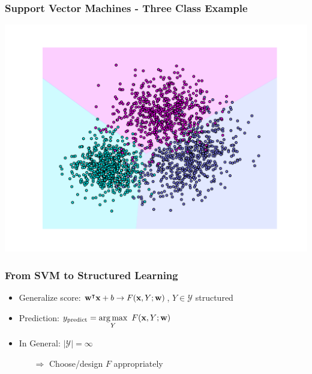 \begin{frame}
    \frametitle{Support Vector Machines - Three Class Example}
    \includegraphics[width=\textwidth]{images/three_class_svm.pdf}
\end{frame}

\begin{frame}
    \frametitle{From SVM to Structured Learning}
    \begin{itemize}
          \item Generalize score: $\textbf{w}^{\intercal}\textbf{x} + b \rightarrow F(\textbf{x}, Y; \textbf{w})$, $Y \in
        \mathcal{Y}$ structured
          \item Prediction: $\displaystyle y_{\text{predict}} = \operatorname*{arg\,max}_Y\ F(\textbf{x}, Y; \textbf{w}) $%
          \item In General: $|\mathcal{Y}| = \infty$
        \begin{itemize}
              \item[$\Rightarrow$] Choose/design $F$ appropriately
        \end{itemize}
          \item[] \cf {}
    \end{itemize}
\end{frame}


